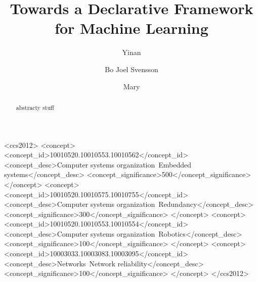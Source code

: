 \documentclass[sigplan,screen,authordraft]{acmart}
\begin{document}
\title{Towards a Declarative Framework for Machine Learning}


\author{Yinan}
\affiliation{%
  \institution{}
  \streetaddress{}
  \city{}
  \country{}}
\email{}
\author{Bo Joel Svensson}
\author{Mary}
\affiliation{%
  \institution{}
  \streetaddress{}
  \city{}
  \country{}}
\email{}

\renewcommand{\shortauthors}{Yu, et al.}

\begin{abstract}

  abstracty stuff

\end{abstract}

\begin{CCSXML}
<ccs2012>
 <concept>
  <concept_id>10010520.10010553.10010562</concept_id>
  <concept_desc>Computer systems organization~Embedded systems</concept_desc>
  <concept_significance>500</concept_significance>
 </concept>
 <concept>
  <concept_id>10010520.10010575.10010755</concept_id>
  <concept_desc>Computer systems organization~Redundancy</concept_desc>
  <concept_significance>300</concept_significance>
 </concept>
 <concept>
  <concept_id>10010520.10010553.10010554</concept_id>
  <concept_desc>Computer systems organization~Robotics</concept_desc>
  <concept_significance>100</concept_significance>
 </concept>
 <concept>
  <concept_id>10003033.10003083.10003095</concept_id>
  <concept_desc>Networks~Network reliability</concept_desc>
  <concept_significance>100</concept_significance>
 </concept>
</ccs2012>
\end{CCSXML}



\end{document}
